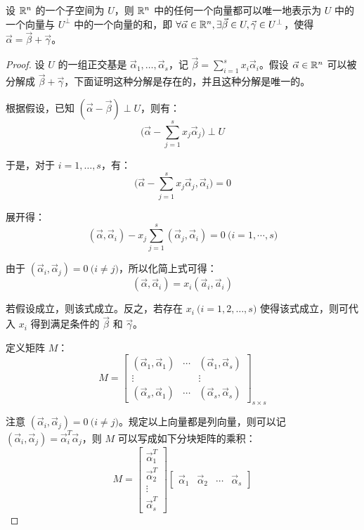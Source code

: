 \begin{theorem}
	设 $\mathbb R^n$ 的一个子空间为 $U$，则 $\mathbb R^n$ 中的任何一个向量都可以唯一地表示为 $U$ 中的一个向量与 $U^\perp$ 中的一个向量的和，即 $\forall \vec \alpha \in \mathbb R^n, \exists \vec \beta \in U, \vec \gamma \in U^\perp$，使得 $\vec \alpha = \vec \beta + \vec \gamma$。
\end{theorem}

\begin{proof}
	设 $U$ 的一组正交基是 $\vec \alpha_1, \ldots, \vec \alpha_s$，记 $\vec \beta = \sum\limits_{i = 1}^{s} x_i \vec \alpha_i$。假设 $\vec \alpha \in \mathbb R^n$ 可以被分解成 $\vec \beta + \vec \gamma$，下面证明这种分解是存在的，并且这种分解是唯一的。

	根据假设，已知 $(\vec \alpha - \vec \beta) \perp U$，则有：
	$$
	\biggl( \vec \alpha - \sum\limits_{j = 1}^s x_j \vec \alpha_j \biggr) \perp U
	$$

	于是，对于 $i = 1, \ldots, s$，有：
	$$
	\biggl( \vec \alpha - \sum\limits_{j = 1}^s x_j \vec \alpha_j, \vec \alpha_i \biggr) = 0
	$$

	展开得：
	$$
	(\vec \alpha, \vec \alpha_i) - x_j \sum\limits_{j = 1}^s (\vec \alpha_j, \vec \alpha_i) = 0 \pod{i = 1, \cdots, s}
	$$

	由于 $(\vec \alpha_i, \vec \alpha_j) = 0 \pod{i \ne j}$，所以化简上式可得：
	$$
	(\vec \alpha, \vec \alpha_i) = x_i (\vec a_i, \vec a_i)
	$$

	若假设成立，则该式成立。反之，若存在 $x_i \pod{i = 1, 2, \ldots, s}$ 使得该式成立，则可代入 $x_i$ 得到满足条件的 $\vec \beta$ 和 $\vec \gamma$。

	\bigskip

	定义矩阵 $M$：
	$$
	M =
	\begin{bmatrix}
	(\vec \alpha_1, \vec \alpha_1) & \cdots & (\vec \alpha_1, \vec \alpha_s)
	\\
	\vdots && \vdots
	\\
	(\vec \alpha_s, \vec \alpha_1) & \cdots & (\vec \alpha_s, \vec \alpha_s)
	\end{bmatrix}_{s \times s}
	$$

	注意 $(\vec \alpha_i, \vec \alpha_j) = 0 \pod{i \ne j}$。规定以上向量都是列向量，则可以记 $(\vec \alpha_i ,\vec \alpha_j) = \vec \alpha_i^T \vec \alpha_j$，则 $M$ 可以写成如下分块矩阵的乘积：
	$$
	M =
	\begin{bmatrix} \vec \alpha_1^T \\ \vec \alpha_2^T \\ \vdots \\ \vec \alpha_s^T \end{bmatrix}
	\begin{bmatrix} \vec \alpha_1 & \vec \alpha_2 & \cdots & \vec \alpha_s \end{bmatrix}
	$$


\end{proof}
